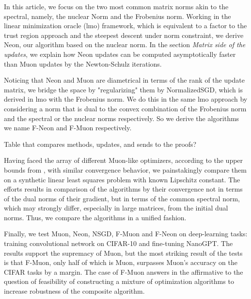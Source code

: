 \documentclass{article} %
\begin{document}
 In this article, we focus on the two most common matrix norms akin to the spectral, namely, the nuclear Norm and the Frobenius norm. Working in the linear minimization oracle (lmo) framework, which is equivalent to a factor to the trust region approach and the steepest descent under norm constraint, we derive Neon, our algorithm based on the nuclear norm. In the section {\it Matrix side of the updates}, we explain how Neon updates can be computed asymptotically faster than Muon updates by the Newton-Schulz iterations.

 Noticing that Neon and Muon are diametrical in terms of the rank of the update matrix, we bridge the space by "regularizing" them by NormalizedSGD, which is derived in lmo with the Frobenius norm. We do this in the same lmo approach by considering a norm that is dual to the convex combination of the Frobenius norm and the spectral or the nuclear norms respectively. So we derive the algorithms we name F-Neon and F-Muon respectively.

 Table that compares methods, updates, and sends to the proofs?

 Having faced the array of different Muon-like optimizers, according to the upper bounds from \cite{kovalev2025understanding,riabinin2025gluon}, with similar convergence behavior, we painstakingly compare them on a synthetic linear least squares problem with known Lipschitz constant. The efforts results in comparison of the algorithms by their convergence not in terms of the dual norms of their gradient, but in terms of the common spectral norm, which may strongly differ, especially in large matrices, from the initial dual norms. Thus, we compare the algorithms in a unified fashion.

 Finally, we test Muon, Neon, NSGD, F-Muon and F-Neon on deep-learning tasks: training convolutional network on CIFAR-10 and fine-tuning NanoGPT. The results support the supremacy of Muon, but the most striking result of the tests is that F-Muon, only half of which is Muon, surpasses Muon's accuracy on the CIFAR tasks by a margin. The case of F-Muon answers in the affirmative to the question of feasibility of constructing a mixture of optimization algorithms to increase robustness of the composite algorithm.
\end{document}

